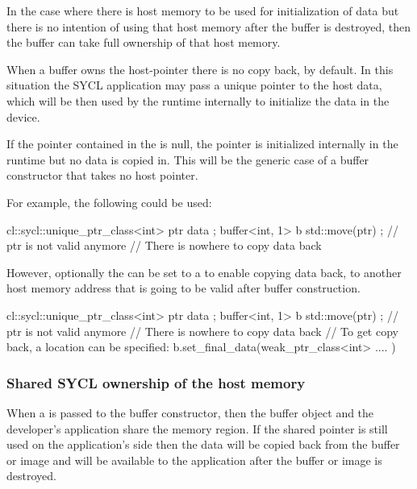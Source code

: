 In the case where there is host memory to be used for initialization of data
but there is no intention of using that host memory after the buffer is
destroyed, then the buffer can take full ownership of that host memory.

When a buffer owns the \gls{host-pointer} there is no copy back, by default.
In this situation the SYCL application may pass a unique pointer to the host data,
which will be then used by the runtime internally to initialize the data in the device.

If the pointer contained in the  is null, the pointer is initialized
internally in the runtime but no data is copied in.
This will be the generic case of a buffer constructor that takes no host
pointer.

For example, the following could be used:
\begin{code}
{
  cl::sycl::unique_ptr_class<int> ptr { data };
  buffer<int, 1> b { std::move(ptr) };
  // ptr is not valid anymore
  // There is nowhere to copy data back
}
\end{code}

However, optionally the  can be
set to a  to enable copying data
back, to another host memory address that is going to be valid after
buffer construction.

\begin{code}
{
  cl::sycl::unique_ptr_class<int> ptr { data };
  buffer<int, 1> b { std::move(ptr) };
  // ptr is not valid anymore
  // There is nowhere to copy data back
  // To get copy back, a location can be specified:
  b.set_final_data(weak_ptr_class<int> { .... })
}
\end{code}



\subsubsection{Shared SYCL ownership of the host memory}

When a  is passed to the buffer constructor, then the buffer object and the developer's application share the memory region. If the shared pointer is still used on the application's
side then the data will be copied back from the buffer or image and will be available
to the application after the buffer or image is destroyed.

